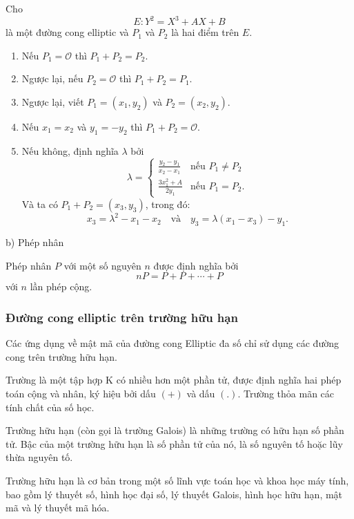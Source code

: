 \begin{theorem}
	\label{th:th2}
	Cho
	$$E:Y^2 = X^3 + AX + B$$
	là một đường cong elliptic và $P_1$  và $P_2$ là hai điểm trên $E$.
	\begin{enumerate}
		\item Nếu $P_1 = \mathcal{O}$ thì $P_1 + P_2 = P_2$.
		\item Ngược lại, nếu $P_2 = \mathcal{O}$ thì $P_1 + P_2 = P_1$.
		\item Ngược lại, viết $P_1 = (x_1, y_2)$ và $P_2 = (x_2, y_2)$.
		\item Nếu $x_1 = x_2$ và $y_1 = -y_2$ thì $P_1 + P_2 = \mathcal{O}$.
		\item Nếu không, định nghĩa $\lambda$ bởi
		      $$ \lambda = \begin{cases}
				      \frac{y_2-y_1}{x_2 - x_1} & \text{nếu } P_1 \neq P_2 \\
				      \frac{3x_1^2 + A}{2y_1}   & \text{nếu } P_1 = P_2.
			      \end{cases} $$
		      Và ta có $P_1 + P_2 = (x_3, y_3)$, trong đó:
		      $$x_3 = \lambda^2 - x_1 - x_2 \ \ \  \text{ và } \ \ \  y_3 = \lambda(x_1 - x_3) - y_1.$$
	\end{enumerate}
\end{theorem}


b) Phép nhân

Phép nhân $P$ với một số nguyên $n$ được định nghĩa bởi 
$$nP = P + P + \cdots + P$$
với $n$ lần phép cộng.

\subsubsection{Đường cong elliptic trên trường hữu hạn}
Các ứng dụng về mật mã của đường cong Elliptic đa số chỉ sử dụng các đường cong trên
trường hữu hạn.

\begin{definition}
    	Trường là một tập hợp K có nhiều hơn một phần tử, được định nghĩa hai phép toán cộng và nhân,
    	ký hiệu bởi dấu $(+)$ và dấu $(.)$. Trường thỏa mãn các tính chất của số học.
\end{definition}

\begin{definition}
	Trường hữu hạn (còn gọi là trường Galois) là những trường có hữu hạn số phần tử.
	Bậc của một trường hữu hạn là số phần tử của nó, là số nguyên tố hoặc lũy thừa nguyên tố.
\end{definition}
Trường hữu hạn là cơ bản trong một số lĩnh vực toán học và khoa học máy tính,
bao gồm lý thuyết số, hình học đại số, lý thuyết Galois, hình học hữu hạn, mật mã và lý thuyết mã hóa.

